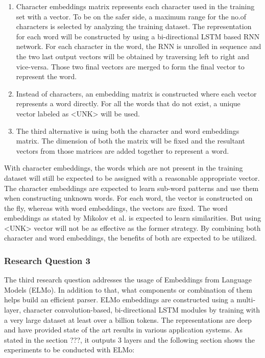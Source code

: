 \documentclass[a4paper, 11pt]{article}
\begin{document}
\begin{enumerate}
\item Character embeddings matrix represents each character used in the training set with a vector. To be on the safer side, a maximum range for the no.of characters is selected by analyzing the training dataset. The representation for each word will be constructed by using a bi-directional LSTM based RNN network. For each character in the word, the RNN is unrolled in sequence and the two last output vectors will be obtained by traversing left to right and vice-versa. Those two final vectors are merged to form the final vector to represent the word.
\item Instead of characters, an embedding matrix is constructed where each vector represents a word directly. For all the words that do not exist, a unique vector labeled as <UNK> will be used. 
\item The third alternative is using both the character and word embeddings matrix. The dimension of both the matrix will be fixed and the resultant vectors from those matrices are added together to represent a word. 
\end{enumerate}

With character embeddings, the words which are not present in the training dataset will still be expected to be assigned with a reasonable appropriate vector. The character embeddings are expected to learn sub-word patterns and use them when constructing unknown words. For each word, the vector is constructed on the fly, whereas with word embeddings, the vectors are fixed. The word embeddings as stated by Mikolov et al. \parencite{mikolov2013linguistic} is expected to learn similarities. But using <UNK> vector will not be as effective as the former strategy. By combining both character and word embeddings, the benefits of both are expected to be utilized. 
\subsubsection{Research Question 3}

The third research question addresses the usage of Embeddings from Language Models (ELMo). In addition to that, what components or combination of them helps build an efficient parser. ELMo embeddings are constructed using a multi-layer, character convolution-based, bi-directional LSTM modules by training with a very large dataset at least over a billion tokens. The representations are deep and have provided state of the art results in various application systems. As stated in the section ???, it outputs 3 layers and the following section shows the experiments to be conducted with ELMo:
\end{document}
